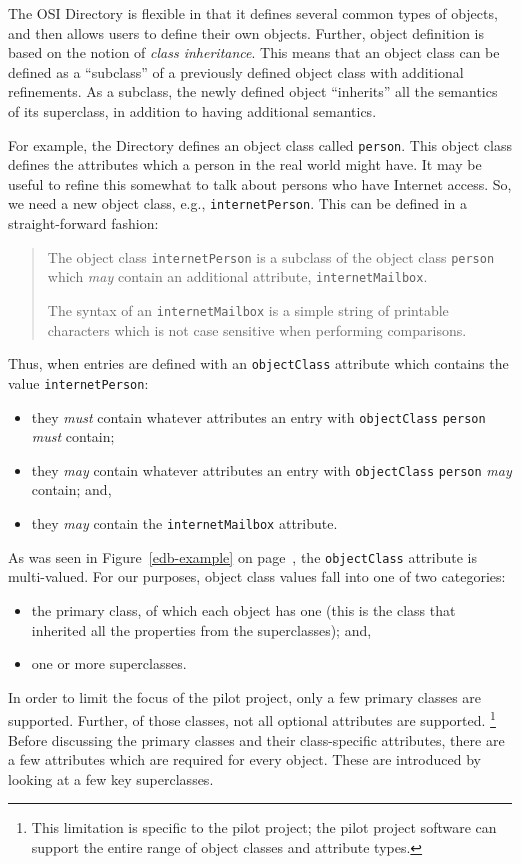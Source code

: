 The OSI Directory is flexible in that it defines several common
types of objects,
and then allows users to define their own objects.
Further,
object definition is based on the notion of {\em class inheritance}.
This means that an object class can be defined as a ``subclass'' of
a previously defined object class with additional refinements.
As a subclass,
the newly defined object ``inherits'' all the semantics of its
superclass,
in addition to having additional semantics.

For example,
the Directory defines an object class called \verb"person".
This object class defines the attributes which a person in
the real world might have.
It may be useful to refine this somewhat to talk about persons
who have Internet access.
So, we need a new object class, e.g., \verb"internetPerson".
This can be defined in a straight-forward fashion:
\begin{quote}
The object class \verb"internetPerson" is a subclass of the object class
\verb"person" which {\em may\/} contain an additional attribute,
\verb"internetMailbox".

The syntax of an \verb"internetMailbox" is a simple string of printable
characters which is not case sensitive when performing comparisons.
\end{quote}
Thus,
when entries are defined with an \verb"objectClass" attribute which contains
the value \verb"internetPerson":
\begin{itemize}
\item	they {\em must\/} contain whatever attributes an entry with
	\verb"objectClass" \verb"person" {\em must\/} contain;

\item	they {\em may\/} contain whatever attributes an entry with
	\verb"objectClass" \verb"person" {\em may\/} contain;
	and,

\item	they {\em may\/} contain the \verb"internetMailbox" attribute.
\end{itemize}

As was seen in Figure~\ref{edb-example} on page~\pageref{edb-example},
the \verb"objectClass" attribute is multi-valued.
For our purposes,
object class values fall into one of two categories:
\begin{itemize}
\item	the primary class,
	of which each object has one
	(this is the class that inherited all the properties from the
	superclasses);
	and,

\item	one or more superclasses.
\end{itemize}
In order to limit the focus of the pilot project,
only a few primary classes are supported.
Further,
of those classes,
not all optional attributes are supported.%
\footnote{This limitation is specific to the pilot project;
the pilot project software can support the entire range of object classes
and attribute types.}
Before discussing the primary classes and their class-specific attributes,
there are a few attributes which are required for every object.
These are introduced by looking at a few key superclasses.

